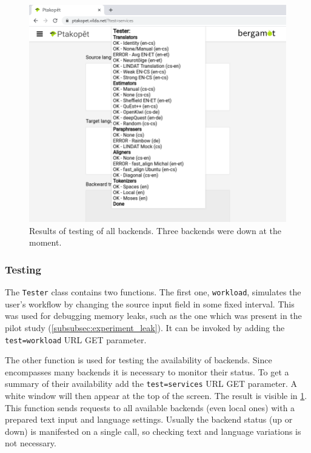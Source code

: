 \begin{figure}[ht]
    \centering
    \includegraphics[width=\textwidth]{img/implementation/test_services.png}
    \caption{Results of testing of all \ptakopet{} backends. Three backends were down at the moment.}
    \label{fig:test_services}
\end{figure}

\subsubsection{Testing} \label{subsubsec:implementation_testing}

The \texttt{Tester} class contains two functions. The first one, \texttt{workload}, simulates the user's workflow by changing the source input field in some fixed interval. This was used for debugging memory leaks, such as the one which was present in the pilot study (\cref{subsubsec:experiment_leak}). It can be invoked by adding the \texttt{test=workload} URL GET parameter.

The other function is used for testing the availability of backends. Since \ptakopet{} encompasses many backends it is necessary to monitor their status. To get a summary of their availability add the \texttt{test=services} URL GET parameter. A white window will then appear at the top of the screen. The result is visible in \cref{fig:test_services}. This function sends requests to all available backends (even local ones) with a prepared text input and language settings. Usually the backend status (up or down) is manifested on a single call, so checking text and language variations is not necessary.


